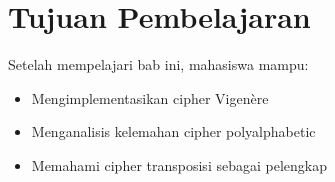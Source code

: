 \section*{Tujuan Pembelajaran}
Setelah mempelajari bab ini, mahasiswa mampu:
\begin{itemize}
\item Mengimplementasikan cipher Vigenère
\item Menganalisis kelemahan cipher polyalphabetic
\item Memahami cipher transposisi sebagai pelengkap
\end{itemize}
